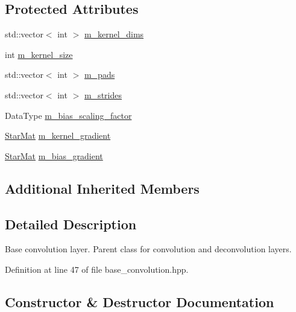 \subsection*{Protected Attributes}
\begin{DoxyCompactItemize}
\item 
std\+::vector$<$ int $>$ \hyperlink{classlbann_1_1base__convolution__layer_a283edb6a476f975e713d0b4235ac658f}{m\+\_\+kernel\+\_\+dims}
\item 
int \hyperlink{classlbann_1_1base__convolution__layer_aa9da3e44499643a86bd611b5eb500dd4}{m\+\_\+kernel\+\_\+size}
\item 
std\+::vector$<$ int $>$ \hyperlink{classlbann_1_1base__convolution__layer_a9732a8a0170a413bf0cde0128ad2a571}{m\+\_\+pads}
\item 
std\+::vector$<$ int $>$ \hyperlink{classlbann_1_1base__convolution__layer_a2429495822363e41f1f6b96a6b430445}{m\+\_\+strides}
\item 
Data\+Type \hyperlink{classlbann_1_1base__convolution__layer_a5abe0bcd128b66a41fa481b28a9c2104}{m\+\_\+bias\+\_\+scaling\+\_\+factor}
\item 
\hyperlink{base_8hpp_aba08580d21767b53d0737e115d738dbe}{Star\+Mat} \hyperlink{classlbann_1_1base__convolution__layer_a4129f11df61ed92bcad24ae855d7bd11}{m\+\_\+kernel\+\_\+gradient}
\item 
\hyperlink{base_8hpp_aba08580d21767b53d0737e115d738dbe}{Star\+Mat} \hyperlink{classlbann_1_1base__convolution__layer_a2ee1db4a1a74f167e3472d5ed7075179}{m\+\_\+bias\+\_\+gradient}
\end{DoxyCompactItemize}
\subsection*{Additional Inherited Members}


\subsection{Detailed Description}
Base convolution layer. Parent class for convolution and deconvolution layers. 

Definition at line 47 of file base\+\_\+convolution.\+hpp.



\subsection{Constructor \& Destructor Documentation}
\mbox{\label{classlbann_1_1base__convolution__layer_a1489c6034dc88a8749ccd0ae4a3b02a8}} 

